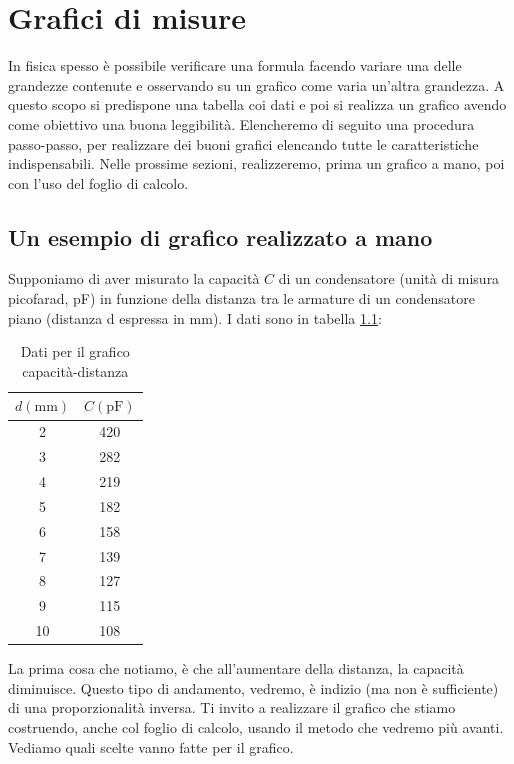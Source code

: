 \chapter{Grafici di misure}
In fisica spesso è possibile verificare una formula facendo variare una delle grandezze contenute e osservando su un grafico come varia un'altra grandezza. A questo scopo si predispone una tabella coi dati e poi si realizza un grafico avendo come obiettivo una buona leggibilità. Elencheremo di seguito una procedura passo-passo, per realizzare dei buoni grafici elencando tutte le caratteristiche indispensabili. Nelle prossime sezioni, realizzeremo, prima un grafico a mano, poi con l'uso del foglio di calcolo.
\section{Un esempio di grafico realizzato a mano}

Supponiamo di aver misurato la capacità $C$ di un condensatore (unità di misura picofarad, pF)  in funzione della distanza tra le armature di un condensatore piano (distanza d espressa in mm). I dati sono in tabella \ref{tab:condensatore}: 

\begin{table}
\begin{center}
{
\def\arraystretch{1.5} %
\begin{tabular}{|c|c|}
\hline 
 $d\left( \si{\milli\meter}\right)$ & $C \left( \si{\pico\farad}\right)$   \\
\hline
2 & 420\\
3 &  282 \\
4 &  219 \\
5 & 182 \\
6 & 158 \\
7 &  139\\
8 &  127\\
9  & 115\\
10 & 108\\
\hline
\end{tabular}
}
\caption{Dati per il grafico capacità-distanza}
\label{tab:condensatore}
\end{center}
\end{table}
La prima cosa che notiamo, è che all'aumentare della distanza, la capacità diminuisce. Questo tipo di andamento, vedremo, è indizio (ma non è sufficiente) di una proporzionalità inversa. Ti invito a realizzare il grafico che stiamo costruendo, anche col foglio di calcolo, usando il metodo che vedremo più avanti. Vediamo quali scelte vanno fatte per il grafico.
